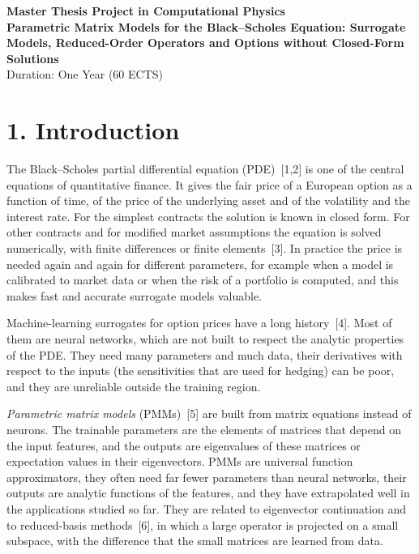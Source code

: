 \documentclass[12pt,a4paper]{article}
\begin{document}
\begin{center}
    {\Large \textbf{Master Thesis Project in Computational Physics}}\\[0.3cm]
    {\large \textbf{Parametric Matrix Models for the Black--Scholes Equation: Surrogate Models, Reduced-Order Operators and Options without Closed-Form Solutions}}\\[0.2cm]
    \vspace{0.3cm}
    {Duration: One Year (60 ECTS)}
\end{center}

\vspace{1cm}

\section*{1. Introduction}

The Black--Scholes partial differential equation (PDE)~[1,2] is one of
the central equations of quantitative finance.  It gives the fair
price of a European option as a function of time, of the price of the
underlying asset and of the volatility and the interest rate.  For
the simplest contracts the solution is known in closed form.  For
other contracts and for modified market assumptions the equation is
solved numerically, with finite differences or finite elements~[3].
In practice the price is needed again and again for different
parameters, for example when a model is calibrated to market data or
when the risk of a portfolio is computed, and this makes fast and
accurate surrogate models valuable.

Machine-learning surrogates for option prices have a long
history~[4].  Most of them are neural networks, which are not built to
respect the analytic properties of the PDE.  They need many
parameters and much data, their derivatives with respect to the
inputs (the sensitivities that are used for hedging) can be poor, and
they are unreliable outside the training region.

\emph{Parametric matrix models} (PMMs)~[5] are built from matrix
equations instead of neurons.  The trainable parameters are the
elements of matrices that depend on the input features, and the
outputs are eigenvalues of these matrices or expectation values in
their eigenvectors.  PMMs are universal function approximators, they
often need far fewer parameters than neural networks, their outputs
are analytic functions of the features, and they have extrapolated
well in the applications studied so far.  They are related to
eigenvector continuation and to reduced-basis methods~[6], in which a
large operator is projected on a small subspace, with the difference
that the small matrices are learned from data.
\end{document}
